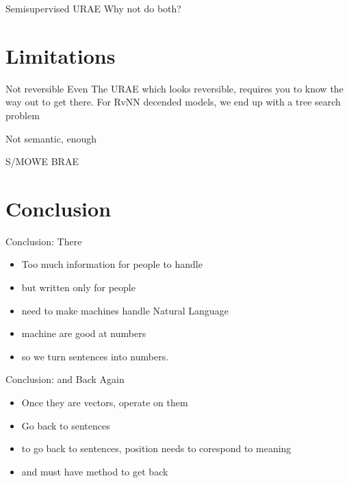 \documentclass[12pt,landscape,english]{beamer}
\begin{document}
\begin{frame} {Semisupervised URAE} 
	Why not do both?
\end{frame}

\section{Limitations}
\begin{frame}{Not reversible}
	Even The URAE which looks reversible, requires you to know the way out to get there.
	For RvNN decended models, we end up with a tree search problem
\end{frame}

\begin{frame}{Not semantic, enough}
	
	S/MOWE
	BRAE
\end{frame}


\section{Conclusion}
\begin{frame}{Conclusion: There}
	\begin{itemize}
		\item Too much information for people to handle
		\item but written only for people
		\item need to make machines handle Natural Language
		\item machine are good at numbers
		\item so we turn sentences into numbers.
	\end{itemize}
\end{frame}

\begin{frame}{Conclusion: and Back Again}
	\begin{itemize}
		\item Once they are vectors, operate on them
		\item Go back to sentences
		\item to go back to sentences, position needs to corespond to meaning
		\item and must have method to get back
	\end{itemize}
\end{frame}


	
\end{document}
